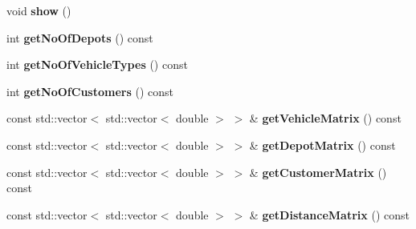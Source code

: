\begin{DoxyCompactItemize}
\mbox{\label{class_init_a9f8816aee25eb57e9a8f133244fbffda}} 
void {\bfseries show} ()
\item 
\mbox{\label{class_init_ad6dd362eb2f7b5ac46af9666b7d920da}} 
int {\bfseries get\+No\+Of\+Depots} () const
\item 
\mbox{\label{class_init_a3589c9bb9d90429ca08c476163aa1b28}} 
int {\bfseries get\+No\+Of\+Vehicle\+Types} () const
\item 
\mbox{\label{class_init_aa734c4109c33931c0b038b622b867c18}} 
int {\bfseries get\+No\+Of\+Customers} () const
\item 
\mbox{\label{class_init_a50e5ae9da26f66e57b81e1cfda053dcb}} 
const std\+::vector$<$ std\+::vector$<$ double $>$ $>$ \& {\bfseries get\+Vehicle\+Matrix} () const
\item 
\mbox{\label{class_init_a8bccc72be332623cdc21c36085787fda}} 
const std\+::vector$<$ std\+::vector$<$ double $>$ $>$ \& {\bfseries get\+Depot\+Matrix} () const
\item 
\mbox{\label{class_init_a571046054e4cc1f40bba8fc2e952c213}} 
const std\+::vector$<$ std\+::vector$<$ double $>$ $>$ \& {\bfseries get\+Customer\+Matrix} () const
\item 
\mbox{\label{class_init_a023ffffca04fa97b54a847cb02b5d0c1}} 
const std\+::vector$<$ std\+::vector$<$ double $>$ $>$ \& {\bfseries get\+Distance\+Matrix} () const
\end{DoxyCompactItemize}

